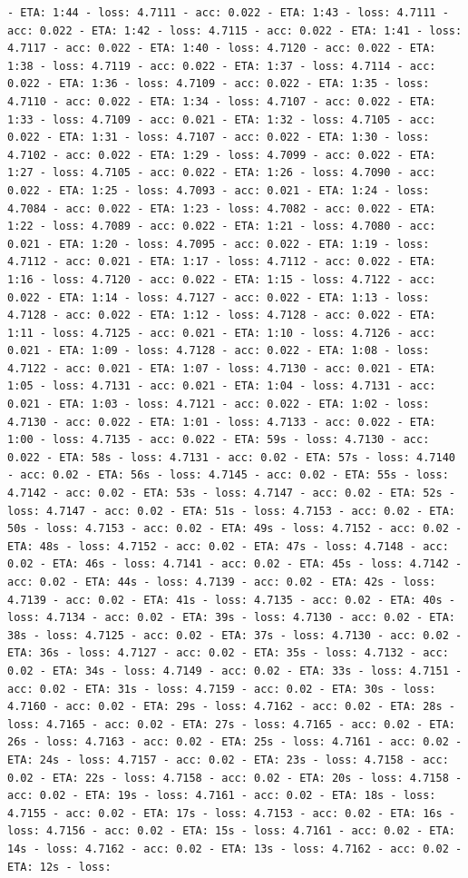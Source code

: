 \documentclass[11pt]{article}
\begin{document}
\begin{Verbatim}[commandchars=\\\{\}]
- ETA: 1:44 - loss: 4.7111 - acc: 0.022 - ETA: 1:43 - loss: 4.7111 - acc: 0.022 - ETA: 1:42 - loss: 4.7115 - acc: 0.022 - ETA: 1:41 - loss: 4.7117 - acc: 0.022 - ETA: 1:40 - loss: 4.7120 - acc: 0.022 - ETA: 1:38 - loss: 4.7119 - acc: 0.022 - ETA: 1:37 - loss: 4.7114 - acc: 0.022 - ETA: 1:36 - loss: 4.7109 - acc: 0.022 - ETA: 1:35 - loss: 4.7110 - acc: 0.022 - ETA: 1:34 - loss: 4.7107 - acc: 0.022 - ETA: 1:33 - loss: 4.7109 - acc: 0.021 - ETA: 1:32 - loss: 4.7105 - acc: 0.022 - ETA: 1:31 - loss: 4.7107 - acc: 0.022 - ETA: 1:30 - loss: 4.7102 - acc: 0.022 - ETA: 1:29 - loss: 4.7099 - acc: 0.022 - ETA: 1:27 - loss: 4.7105 - acc: 0.022 - ETA: 1:26 - loss: 4.7090 - acc: 0.022 - ETA: 1:25 - loss: 4.7093 - acc: 0.021 - ETA: 1:24 - loss: 4.7084 - acc: 0.022 - ETA: 1:23 - loss: 4.7082 - acc: 0.022 - ETA: 1:22 - loss: 4.7089 - acc: 0.022 - ETA: 1:21 - loss: 4.7080 - acc: 0.021 - ETA: 1:20 - loss: 4.7095 - acc: 0.022 - ETA: 1:19 - loss: 4.7112 - acc: 0.021 - ETA: 1:17 - loss: 4.7112 - acc: 0.022 - ETA: 1:16 - loss: 4.7120 - acc: 0.022 - ETA: 1:15 - loss: 4.7122 - acc: 0.022 - ETA: 1:14 - loss: 4.7127 - acc: 0.022 - ETA: 1:13 - loss: 4.7128 - acc: 0.022 - ETA: 1:12 - loss: 4.7128 - acc: 0.022 - ETA: 1:11 - loss: 4.7125 - acc: 0.021 - ETA: 1:10 - loss: 4.7126 - acc: 0.021 - ETA: 1:09 - loss: 4.7128 - acc: 0.022 - ETA: 1:08 - loss: 4.7122 - acc: 0.021 - ETA: 1:07 - loss: 4.7130 - acc: 0.021 - ETA: 1:05 - loss: 4.7131 - acc: 0.021 - ETA: 1:04 - loss: 4.7131 - acc: 0.021 - ETA: 1:03 - loss: 4.7121 - acc: 0.022 - ETA: 1:02 - loss: 4.7130 - acc: 0.022 - ETA: 1:01 - loss: 4.7133 - acc: 0.022 - ETA: 1:00 - loss: 4.7135 - acc: 0.022 - ETA: 59s - loss: 4.7130 - acc: 0.022 - ETA: 58s - loss: 4.7131 - acc: 0.02 - ETA: 57s - loss: 4.7140 - acc: 0.02 - ETA: 56s - loss: 4.7145 - acc: 0.02 - ETA: 55s - loss: 4.7142 - acc: 0.02 - ETA: 53s - loss: 4.7147 - acc: 0.02 - ETA: 52s - loss: 4.7147 - acc: 0.02 - ETA: 51s - loss: 4.7153 - acc: 0.02 - ETA: 50s - loss: 4.7153 - acc: 0.02 - ETA: 49s - loss: 4.7152 - acc: 0.02 - ETA: 48s - loss: 4.7152 - acc: 0.02 - ETA: 47s - loss: 4.7148 - acc: 0.02 - ETA: 46s - loss: 4.7141 - acc: 0.02 - ETA: 45s - loss: 4.7142 - acc: 0.02 - ETA: 44s - loss: 4.7139 - acc: 0.02 - ETA: 42s - loss: 4.7139 - acc: 0.02 - ETA: 41s - loss: 4.7135 - acc: 0.02 - ETA: 40s - loss: 4.7134 - acc: 0.02 - ETA: 39s - loss: 4.7130 - acc: 0.02 - ETA: 38s - loss: 4.7125 - acc: 0.02 - ETA: 37s - loss: 4.7130 - acc: 0.02 - ETA: 36s - loss: 4.7127 - acc: 0.02 - ETA: 35s - loss: 4.7132 - acc: 0.02 - ETA: 34s - loss: 4.7149 - acc: 0.02 - ETA: 33s - loss: 4.7151 - acc: 0.02 - ETA: 31s - loss: 4.7159 - acc: 0.02 - ETA: 30s - loss: 4.7160 - acc: 0.02 - ETA: 29s - loss: 4.7162 - acc: 0.02 - ETA: 28s - loss: 4.7165 - acc: 0.02 - ETA: 27s - loss: 4.7165 - acc: 0.02 - ETA: 26s - loss: 4.7163 - acc: 0.02 - ETA: 25s - loss: 4.7161 - acc: 0.02 - ETA: 24s - loss: 4.7157 - acc: 0.02 - ETA: 23s - loss: 4.7158 - acc: 0.02 - ETA: 22s - loss: 4.7158 - acc: 0.02 - ETA: 20s - loss: 4.7158 - acc: 0.02 - ETA: 19s - loss: 4.7161 - acc: 0.02 - ETA: 18s - loss: 4.7155 - acc: 0.02 - ETA: 17s - loss: 4.7153 - acc: 0.02 - ETA: 16s - loss: 4.7156 - acc: 0.02 - ETA: 15s - loss: 4.7161 - acc: 0.02 - ETA: 14s - loss: 4.7162 - acc: 0.02 - ETA: 13s - loss: 4.7162 - acc: 0.02 - ETA: 12s - loss: 
\end{Verbatim}
\end{document}
